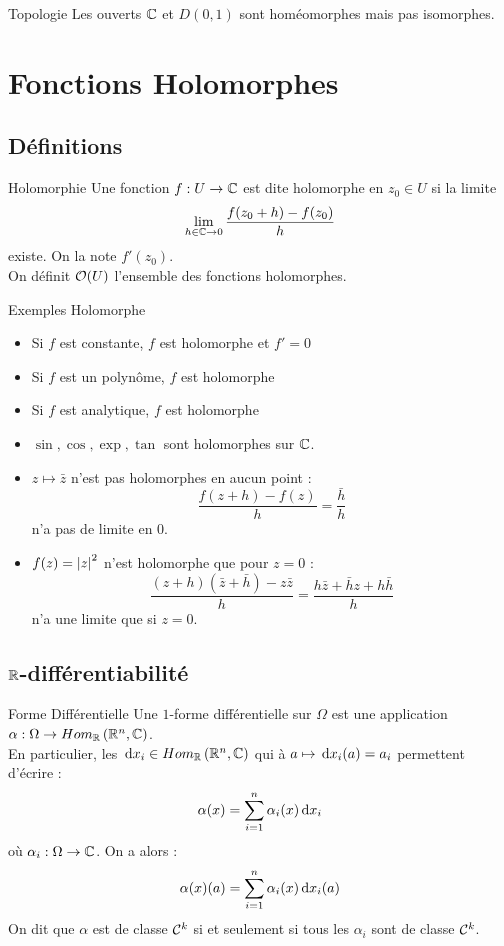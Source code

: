 \documentclass{cours}
\begin{document}
\begin{théorème}{Topologie}{}
    Les ouverts $\mathbb{C}$ et $D(0, 1)$ sont homéomorphes mais pas isomorphes. 
\end{théorème}


\section{Fonctions Holomorphes}
\subsection{Définitions}
\begin{définition}{Holomorphie}{}
    Une fonction $f : U \to \mathbb{C}$ est dite holomorphe en $z_{0} \in U$ si la limite \[\lim_{h \in \mathbb{C} \to 0} \frac{f(z_{0} + h) - f(z_{0})}{h}\] existe. On la note $f'(z_{0})$.\\
    On définit $\mathcal{O}(U)$ l'ensemble des fonctions holomorphes.
\end{définition}

\begin{propositionfr}{Exemples Holomorphe}{}
    \begin{itemize}
        \item Si $f$ est constante, $f$ est holomorphe et $f' = 0$
        \item Si $f$ est un polynôme, $f$ est holomorphe
        \item Si $f$ est analytique, $f$ est holomorphe
        \item $\sin, \cos, \exp, \tan$ sont holomorphes sur $\mathbb{C}$.
        \item $z \mapsto \bar{z}$ n'est pas holomorphes en aucun point : 
        \[
            \frac{f(z + h) - f(z)}{h} = \frac{\bar{h}}{h}
        \]
        n'a pas de limite en $0$. 
        \item $f(z) = \left|z\right|^{2}$ n'est holomorphe que pour $z = 0$ : 
        \[
            \frac{\left(z + h\right)\left(\bar{z} + \bar{h}\right) - z\bar{z}}{h} = \frac{h\bar{z} + \bar{h}z + h\bar{h}}{h}
        \]
        n'a une limite que si $z = 0$. 
    \end{itemize}
\end{propositionfr}

\subsection{$\mathbb{R}$-différentiabilité}
\begin{définition}{Forme Différentielle}{}
    Une $1$-forme différentielle sur $\Omega$ est une application $\alpha : \Omega \to Hom_{\mathbb{R}}\left(\mathbb{R}^{n}, \mathbb{C}\right)$.\\
    En particulier, les ${\rm \, d} x_{i} \in Hom_{\mathbb{R}}\left(\mathbb{R}^{n}, \mathbb{C}\right)$ qui à $a \mapsto {\rm \, d} x_{i}(a) = a_{i}$ permettent d'écrire : 
    \[
        \alpha(x) = \sum_{i = 1}^{n} \alpha_{i}(x){\rm \, d} x_{i}
    \]
    où $\alpha_{i} : \Omega \to \mathbb{C}$. On a alors : 
    \[
        \alpha(x)(a) = \sum_{i = 1}^{n}\alpha_{i}(x){\rm \, d} x_{i}(a)
    \]
    On dit que $\alpha$ est de classe $\mathcal{C}^{k}$ si et seulement si tous les $\alpha_{i}$ sont de classe $\mathcal{C}^{k}$.
\end{définition}
\end{document}
